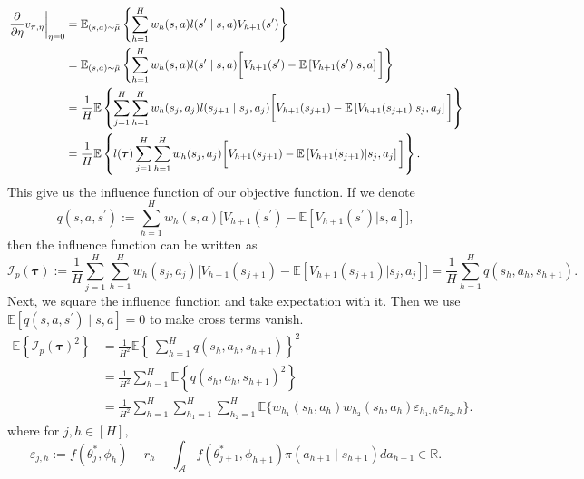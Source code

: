 \documentclass{article}
\numberwithin{equation}{section}
\theoremstyle{plain}
\theoremstyle{definition}
\theoremstyle{remark}
\begin{document}
    \begin{align*}
        \left.\frac{\partial}{\partial \eta}v_{\pi,\eta}\right|_{\eta = 0}
        &= \mathbb{E}_{(s,a) \sim \Bar{\mu}} \left\{ \sum_{h=1}^{H} w_h(s,a)  l(s^{\prime} \mid s,a) V_{h+1}(s^{\prime}) \right\}\\
        &= \mathbb{E}_{(s,a) \sim \Bar{\mu}} \left\{ \sum_{h=1}^{H} w_h(s,a)  l(s^{\prime} \mid s,a) \bigg[V_{h+1}(s^{\prime}) - \mathbb{E} \left[V_{h+1}(s^{\prime}) | s,a\right]\bigg]\right\}\\
        &= \frac{1}{H} \mathbb{E}\left\{\sum_{j=1}^H \sum_{h=1}^H w_h(s_j,a_j) l(s_{j+1}\mid s_j,a_j) \bigg[V_{h+1}(s_{j+1}) - \mathbb{E} \left[V_{h+1}(s_{j+1}) | s_j,a_j\right]\bigg]\right\}\\
        &= \frac{1}{H} \mathbb{E}\left\{l(\boldsymbol{\tau}) \sum_{j=1}^H \sum_{h=1}^H w_h(s_j,a_j) \bigg[V_{h+1}(s_{j+1}) - \mathbb{E} \left[V_{h+1}(s_{j+1}) | s_j,a_j\right]\bigg]\right\}.
    \end{align*}
    This give us the influence function of our objective function. If we denote
    \begin{equation*}
        q(s,a,s^{\prime}) := \sum_{h=1}^H w_h(s,a) \bigg[V_{h+1}(s^{\prime}) - \mathbb{E} \left[V_{h+1}(s^{\prime}) | s,a\right]\bigg],
    \end{equation*}
    then the influence function can be written as
    \begin{equation}\label{influence_function}
        \mathcal{I}_p(\boldsymbol{\tau}) := \frac{1}{H} \sum_{j=1}^H \sum_{h=1}^H w_h(s_j,a_j) \bigg[V_{h+1}(s_{j+1}) - \mathbb{E} \left[V_{h+1}(s_{j+1}) | s_j,a_j\right]\bigg] = \frac{1}{H} \sum_{h=1}^H q(s_h,a_h,s_{h+1}). 
    \end{equation}
    Next, we square the influence function and take expectation with it. Then we use $\mathbb{E}\left[q(s,a,s^{\prime}) \mid s,a\right] = 0$ to make cross terms vanish.
    \begin{align*}
        \mathbb{E}\left\{\mathcal{I}_p(\boldsymbol{\tau})^2\right\}
        &= \frac{1}{H^2} \mathbb{E}\left\{\ \sum_{h=1}^H q(s_h,a_h,s_{h+1}) \right\}^2\\
        &= \frac{1}{H^2} \sum_{h=1}^H  \mathbb{E}\left\{q(s_h,a_h,s_{h+1})^2 \right\}\\
        &= \frac{1}{H^2} \sum_{h=1}^H \sum_{h_1 = 1}^H \sum_{h_2=1}^H \mathbb{E} \bigg\{w_{h_1}(s_h,a_h) w_{h_2}(s_h,a_h) \varepsilon_{h_1,h} \varepsilon_{h_2,h}\bigg\}.
    \end{align*}
    where for $j,h \in [H],$
    \begin{equation*}
        \varepsilon_{j,h} := f\left(\theta_{j}^*, \phi_{h}\right)-r_{h}-\int_{\mathcal{A}} f\left(\theta_{j+1}^*, \phi_{h+1}\right) \pi\left(a_{h+1} \mid s_{h+1}\right) d a_{h+1} \in \mathbb{R}.
    \end{equation*}
\end{document}
